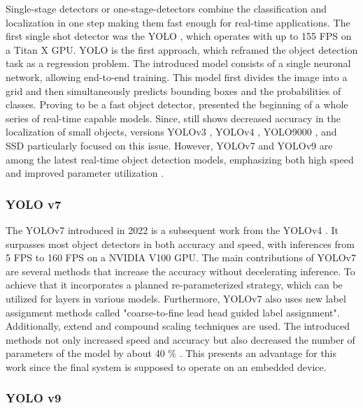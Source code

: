 Single-stage detectors or one-stage-detectors combine the classification and localization in one step making them fast enough for real-time applications.
The first single shot detector was the \ac{YOLO} \cite{YOLOv1}, which operates with up to 155 FPS on a Titan X GPU.
\ac{YOLO} is the first approach, which reframed the object detection task as a regression problem.
The introduced model consists of a single neuronal network, allowing end-to-end training.
This model first divides the image into a grid and then simultaneously predicts bounding boxes and the probabilities of classes.
Proving to be a fast object detector, \cite{YOLOv1} presented the beginning of a whole series of real-time capable models.
Since, \cite{YOLOv1} still shows decreased accuracy in the localization of small objects, versions \ac{YOLO}v3 \cite{yolov3}, \ac{YOLO}v4 \cite{yolov4}, \ac{YOLO}9000 \cite{yolo9000}, and \ac{SSD} \cite{SSD_model} particularly focused on this issue.
However, \ac{YOLO}v7 \cite{yolov7} and \ac{YOLO}v9 \cite{YOLOv9} are among the latest real-time object detection models, emphasizing both high speed and improved parameter utilization \cite{20yearsSurvey, surveyObjectDetection, surveyObjectDetection2019, realTimeObjectDetection}.

\clearpage

\subsubsection{YOLO v7}
\label{subsubsec:YOLOv7}

The \ac{YOLO}v7 \cite{yolov7} introduced in 2022 is a subsequent work from the \ac{YOLO}v4 \cite{yolov4}.
It surpasses most object detectors in both accuracy and speed, with inferences from 5 FPS to 160 FPS on a NVIDIA V100 GPU.
The main contributions of \ac{YOLO}v7 \cite{yolov7} are several methods that increase the accuracy without decelerating inference.
To achieve that it incorporates a planned re-parameterized strategy, which can be utilized for layers in various models.
Furthermore, \ac{YOLO}v7 \cite{yolov7} also uses new label assignment methods called "coarse-to-fine lead head guided label assignment".
Additionally, extend and compound scaling techniques are used.
The introduced methods not only increased speed and accuracy but also decreased the number of parameters of the model by about 40 \% \cite{yolov7}.
This presents an advantage for this work since the final system is supposed to operate on an embedded device.

\subsubsection{YOLO v9}
\label{subsubsec:YOLOv9}

